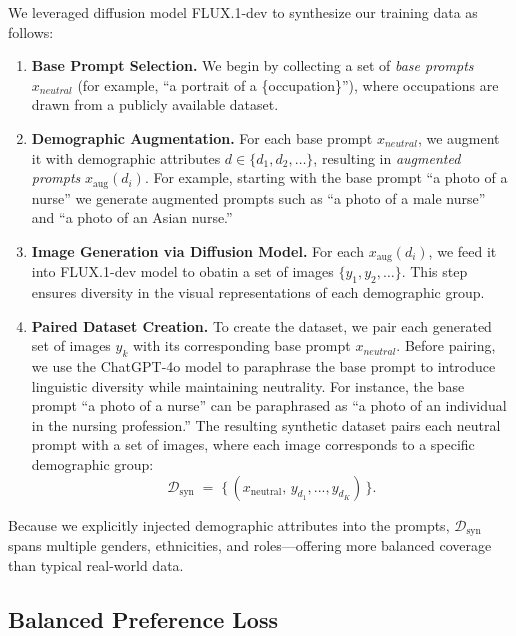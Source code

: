 We leveraged diffusion model FLUX.1-dev\cite{flux2023} to synthesize our training data as follows:
\vspace{-1em}
\begin{enumerate}[leftmargin=1em]
    \item \textbf{Base Prompt Selection.}  
    We begin by collecting a set of \emph{base prompts} $x_{neutral}$ (for example, ``a portrait of a \{occupation\}''), where occupations are drawn from a publicly available dataset\cite{shen2024finetuningtexttoimagediffusionmodels}. 
    
    \item \textbf{Demographic Augmentation.}  
    For each base prompt $x_{neutral}$, we augment it with demographic attributes $d \in \{d_1, d_2, \dots\}$, resulting in \emph{augmented prompts} $x_{\text{aug}}(d_i)$. For example, starting with the base prompt ``a photo of a nurse'' we generate augmented prompts such as ``a photo of a male nurse'' and ``a photo of an Asian nurse.''  
    
    \item \textbf{Image Generation via Diffusion Model.}  
    For each $x_{\text{aug}}(d_i)$, we feed it into FLUX.1-dev\cite{flux2023} model to obatin a set of images $\{y_1, y_2, \dots\}$. This step ensures diversity in the visual representations of each demographic group.
    
    \item \textbf{Paired Dataset Creation.}  
    To create the dataset, we pair each generated set of images $y_k$ with its corresponding base prompt $x_{neutral}$. Before pairing, we use the ChatGPT-4o model to paraphrase the base prompt to introduce linguistic diversity while maintaining neutrality. For instance, the base prompt ``a photo of a nurse'' can be paraphrased as ``a photo of an individual in the nursing profession.'' The resulting synthetic dataset pairs each neutral prompt with a set of images, where each image corresponds to a specific demographic group:
    \[
        \mathcal{D}_{\mathrm{syn}} 
        \;=\; \bigl\{\,(x_{\mathrm{neutral}},\, y_{d_1},..., y_{d_K})\,\bigr\}.
    \]
\end{enumerate}

Because we explicitly injected demographic attributes into the prompts, $\mathcal{D}_{\mathrm{syn}}$ spans multiple genders, ethnicities, and roles—offering more balanced coverage than typical real-world data.

\subsection{Balanced Preference Loss}

